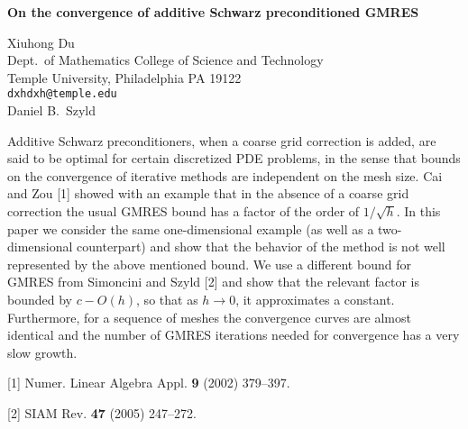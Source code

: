 \documentclass{report}
\begin{document}

\begin{center}
{\large
{\bf On the convergence of additive Schwarz preconditioned GMRES}}

	Xiuhong Du \\
	Dept.~of Mathematics College of Science and Technology \\
	Temple University, Philadelphia PA 19122 \\
	{\tt dxhdxh@temple.edu} \\
	Daniel B.~Szyld
\end{center}
Additive Schwarz preconditioners, when a coarse grid
correction is added, are said to be optimal for certain
discretized PDE problems, in the sense that bounds on the
convergence of iterative methods are independent on the mesh
size. Cai and Zou [1]
showed with an
example that in the absence of a coarse grid correction the
usual GMRES bound has a factor of the order of $1/\sqrt h$.
In this paper we consider the same one-dimensional example
(as well as a two-dimensional counterpart) and show that the
behavior of the method is not well represented by the above
mentioned bound. We use a different bound for GMRES from
Simoncini and Szyld [2]
and show that the relevant factor is
bounded by $c-O(h)$, so that as $h\rightarrow 0$, it
approximates a constant. Furthermore, for a sequence of
meshes the convergence curves are almost identical and the
number of GMRES iterations needed for convergence has a very
slow growth.

[1] Numer. Linear Algebra Appl. {\bf 9} (2002) 379--397.

[2] SIAM Rev. {\bf 47} (2005) 247--272.


\end{document}
